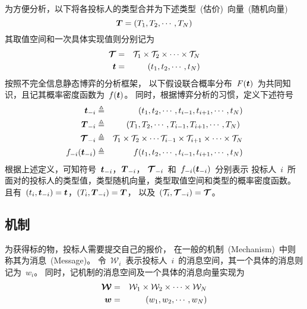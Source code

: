 \documentclass[a4paper,12pt]{article}
\newcommand{\mv}[1]{\mbox{\boldmath$#1$}}         %
\begin{document}
为方便分析，以下将各投标人的类型合并为下述类型~(估价)~向量~(随机向量)
\begin{equation*}
    \mv{T}=(T_1,T_2,\cdots,T_N)
\end{equation*}
其取值空间和一次具体实现值则分别记为
\begin{eqnarray*}
  \mv{\mathcal{T}} &=& \mathcal{T}_1\times\mathcal{T}_2\times\cdots\times\mathcal{T}_N \\
  \mv{t} &=& (t_1,t_2,\cdots,t_N)
\end{eqnarray*}
按照不完全信息静态博弈的分析框架，
以下假设联合概率分布~$F(\mv{t})$~为共同知识，且记其概率密度函数为~$f(\mv{t})$。
同时，根据博弈分析的习惯，定义下述符号
 \begin{eqnarray*}
  \mv{t}_{-i} &\triangleq& (t_1,t_2,\cdots,t_{i-1},t_{i+1},\cdots,t_N) \\
  \mv{T}_{-i} &\triangleq& (T_1,T_2,\cdots,T_{i-1},T_{i+1},\cdots,T_N)~ \\
  \mv{\mathcal{T}}_{-i} &\triangleq& \mathcal{T}_1\times\mathcal{T}_2\times\cdots\mathcal{T}_{i-1}
                            \times\mathcal{T}_{i+1}\times\cdots\times\mathcal{T}_N \\
  f_{-i}(\mv{t}_{-i}) &\triangleq& f(t_1,t_2,\cdots,t_{i-1},t_{i+1},\cdots,t_N)
\end{eqnarray*}
根据上述定义，可知符号~$\mv{t}_{-i}$，$\mv{T}_{-i}$，
$\mv{\mathcal{T}}_{-i}$~和~$f_{-i}(\mv{t}_{-i})$~分别表示
投标人~$i$~所面对的投标人的类型值，类型随机向量，类型取值空间和类型的概率密度函数。
且有~$(t_i,\mv{t}_{-i})=\mv{t}$，$(T_i,\mv{T}_{-i})=\mv{T}$，
以及~$(\mathcal{T}_i,\mv{\mathcal{T}}_{-i})=\mv{\mathcal{T}}$。


 \subsection{机制}

为获得标的物，投标人需要提交自己的报价，
在一般的机制~(Mechanism)~中则称其为消息~(Message)。
令~$\mathcal{W}_i$~表示投标人~$i$~的消息空间，其一个具体的消息则记为~$w_i$。
同时，记机制的消息空间及一个具体的消息向量实现为
\begin{eqnarray*}
  \mv{\mathcal{W}} &=& \mathcal{W}_1\times\mathcal{W}_2
                       \times\cdots\times\mathcal{W}_N \\
  \mv{w} &=& (w_1,w_2,\cdots,w_N)
\end{eqnarray*}
\end{document}
